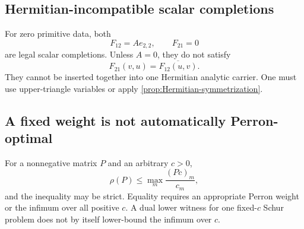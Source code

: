 \subsection{Hermitian-incompatible scalar completions}

For zero primitive data, both
\[
 F_{12}=Ae_{2,2},
 \qquad
 F_{21}=0
\]
are legal scalar completions.  Unless \(A=0\), they do not satisfy
\[
 F_{21}(v,u)=\overline{F_{12}(u,v)}.
\]
They cannot be inserted together into one Hermitian analytic carrier.
One must use upper-triangle variables or apply
\cref{prop:Hermitian-symmetrization}.

\subsection{A fixed weight is not automatically Perron-optimal}

For a nonnegative matrix \(P\) and an arbitrary \(c>0\),
\[
 \rho(P)\le\max_m\frac{(Pc)_m}{c_m},
\]
and the inequality may be strict.  Equality requires an appropriate
Perron weight or the infimum over all positive \(c\).  A dual lower
witness for one fixed-\(c\) Schur problem does not by itself lower-bound
the infimum over \(c\).

